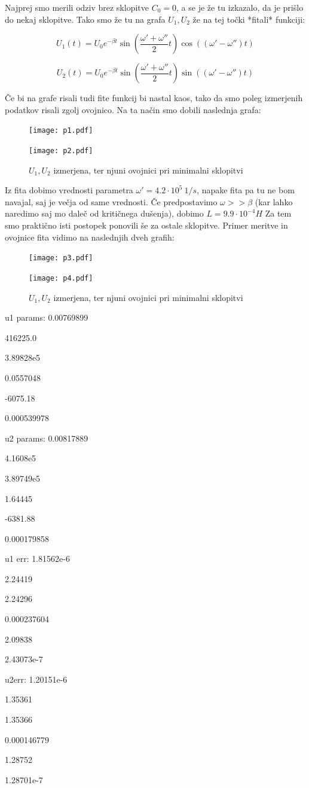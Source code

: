 \documentclass[12pt]{article}
\begin{document}
Najprej smo merili odziv brez sklopitve $C_0 = 0$, a se je že tu izkazalo, da je prišlo do nekaj sklopitve. Tako smo že tu na grafa $U_1, U_2$ že na tej točki *fitali* funkciji:

$$U_1(t) = U_0 e^{-\beta t} \sin \left(\frac{\omega ' + \omega''}{2}t\right)\cos\left((\omega'-\omega'')t\right)$$

$$U_2(t) = U_0 e^{-\beta t} \sin \left(\frac{\omega ' + \omega''}{2}t\right)\sin\left((\omega'-\omega'')t\right)$$

Če bi na grafe risali tudi fite funkcij bi nastal kaos, tako da smo poleg izmerjenih podatkov risali zgolj ovojnico. Na ta način smo dobili naslednja grafa:
\newpage

\begin{figure}[h]
\centering
\begin{minipage}[t]{0.45\textwidth}
    \texttt{[image: p1.pdf]}

\end{minipage}
\hfill
\begin{minipage}[t]{0.45\textwidth}
    \texttt{[image: p2.pdf]}

\end{minipage}
\caption{$U_1, U_2$ izmerjena, ter njuni ovojnici pri minimalni sklopitvi}
\end{figure}

Iz fita dobimo vrednosti parametra $\omega' = 4.2\cdot 10^5 \ 1/s$, napake fita pa tu ne bom navajal, saj je večja od same vrednosti. Če predpostavimo $\omega >> \beta$ (kar lahko naredimo saj mo daleč od kritičnega dušenja), dobimo $L = 9.9\cdot 10^{-4} H$ Za tem smo praktično isti postopek ponovili še za ostale sklopitve. Primer meritve in ovojnice fita vidimo na naslednjih dveh grafih:

\begin{figure}[h]
\centering
\begin{minipage}[t]{0.45\textwidth}
    \texttt{[image: p3.pdf]}

\end{minipage}
\hfill
\begin{minipage}[t]{0.45\textwidth}
    \texttt{[image: p4.pdf]}

\end{minipage}
\caption{$U_1, U_2$ izmerjena, ter njuni ovojnici pri minimalni sklopitvi}
\end{figure}

u1 params: 0.00769899

416225.0

3.89828e5

0.0557048

-6075.18

0.000539978

u2 params: 0.00817889

4.1608e5

3.89749e5

1.64445

-6381.88

0.000179858

u1 err: 1.81562e-6

2.24419

2.24296

0.000237604

2.09838

2.43073e-7

u2err: 1.20151e-6

1.35361

1.35366

0.000146779

1.28752

1.28701e-7
\end{document}
